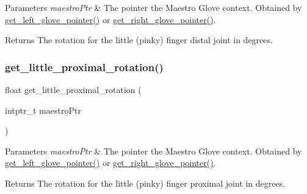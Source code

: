 \begin{DoxyParams}{Parameters}
{\em maestro\+Ptr} & The pointer the Maestro Glove context. Obtained by \hyperlink{group__glove_management_ga63ce3c99d4a8b8db851b22af9185764e}{get\+\_\+left\+\_\+glove\+\_\+pointer()} or \hyperlink{group__glove_management_ga9b8fd9d91aeac3f8da50f7a7eba0c32b}{get\+\_\+right\+\_\+glove\+\_\+pointer()}. \\
\hline
\end{DoxyParams}
\begin{DoxyReturn}{Returns}
The rotation for the little (pinky) finger distal joint in degrees. 
\end{DoxyReturn}
\mbox{\label{group__rotation_access_ga92c96531688ae5be50890e7883eccd05}} 
\subsubsection{\texorpdfstring{get\+\_\+little\+\_\+proximal\+\_\+rotation()}{get\_little\_proximal\_rotation()}}
{\footnotesize\ttfamily float get\+\_\+little\+\_\+proximal\+\_\+rotation (\begin{DoxyParamCaption}\item[{intptr\+\_\+t}]{maestro\+Ptr }\end{DoxyParamCaption})}


\begin{DoxyParams}{Parameters}
{\em maestro\+Ptr} & The pointer the Maestro Glove context. Obtained by \hyperlink{group__glove_management_ga63ce3c99d4a8b8db851b22af9185764e}{get\+\_\+left\+\_\+glove\+\_\+pointer()} or \hyperlink{group__glove_management_ga9b8fd9d91aeac3f8da50f7a7eba0c32b}{get\+\_\+right\+\_\+glove\+\_\+pointer()}. \\
\hline
\end{DoxyParams}
\begin{DoxyReturn}{Returns}
The rotation for the little (pinky) finger proximal joint in degrees. 
\end{DoxyReturn}
\mbox{\label{group__rotation_access_gad356c1f99c4dbb4631a28f0cf8e654b5}} 
